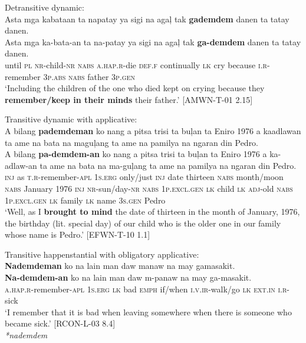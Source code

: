 \ea
Detransitive dynamic: \\
Asta  mga  kabataan  ta  napatay  ya  sigi  na  agaļ tak  \textbf{gademdem}  danen  ta  tatay  danen. \\\smallskip
\gll Asta  mga  ka-bata-an  ta  na-patay  ya  sigi  na  agaļ tak  \textbf{ga-demdem}  danen  ta  tatay  danen. \\
until  \textsc{pl}  \textsc{nr}-child-\textsc{nr}  \textsc{nabs}  \textsc{a.hap.r}-die  \textsc{def.f}  continually  \textsc{lk}  cry
because  \textsc{i.r}-remember  3\textsc{p.abs}  \textsc{nabs}  father  3\textsc{p.gen} \\
\glt `Including the children of the one who died kept on crying because they \textbf{remember/keep in their minds} their father.’ [AMWN-T-01 2.15]
\z

\ea
Transitive dynamic with applicative: \\
A  bilang  \textbf{pademdeman}  ko  nang  a  pitsa  trisi  ta buļan  ta  Eniro  1976  a  kaadlawan  ta  ame  na bata  na  maguļang  ta  ame  na  pamilya  na  ngaran  din  Pedro. \\\smallskip
\gll A  bilang  \textbf{pa-demdem-an}  ko  nang  a  pitsa  trisi  ta buļan  ta  Eniro  1976  a  ka-adlaw-an  ta  ame  na bata  na  ma-guļang  ta  ame  na  pamilya  na  ngaran  din  Pedro. \\
\textsc{inj}  as  \textsc{t.r}-remember-\textsc{apl}  1\textsc{s.erg}  only/just  \textsc{inj}  date  thirteen  \textsc{nabs}
month/moon  \textsc{nabs}  January  \textsc{1976}  \textsc{inj}  \textsc{nr}-sun/day-\textsc{nr}  \textsc{nabs}  1\textsc{p.excl.gen}  \textsc{lk} child  \textsc{lk}  \textsc{adj}-old  \textsc{nabs}  1\textsc{p.excl.gen}  \textsc{lk}  family  \textsc{lk}  name  3\textsc{s.gen}  Pedro \\
\glt `Well, as I \textbf{brought to mind} the date of thirteen in the month of January, 1976, the birthday (lit. special day) of our child who is the older one in our family whose name is Pedro.’ [EFWN-T-10 1.1]
\z

\ea
Transitive happenstantial with obligatory applicative: \\
\textbf{Nademdeman}  ko  na  lain  man  daw  manaw  na may  gamasakit. \\\smallskip
\gll \textbf{Na-demdem-an}  ko  na  lain  man  daw  m-panaw  na may  ga-masakit. \\
\textsc{a.hap.r}-remember-\textsc{apl}  1\textsc{s.erg}  \textsc{lk}  bad  \textsc{emph}  if/when  \textsc{i.v.ir}-walk/go  \textsc{lk}
\textsc{ext.in}  \textsc{i.r}-sick \\
\glt ‘I remember that it is bad when leaving somewhere when there is someone who became sick.’ [RCON-L-03 8.4] \\\smallskip
\textit{*nademdem}
\z

